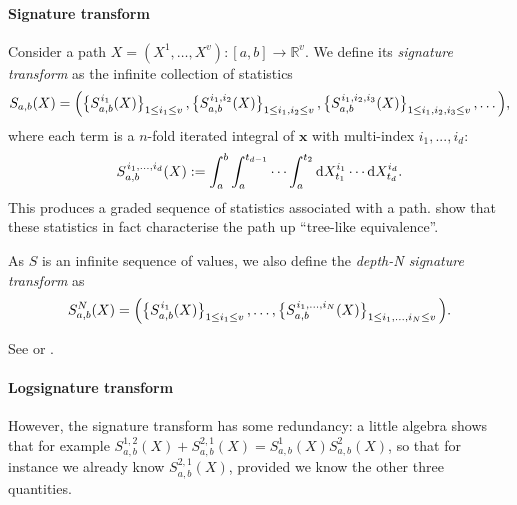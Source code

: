 \paragraph{Signature transform} Consider a path $X = (X^1, \ldots, X^v) \colon [a, b] \rightarrow \mathbb{R}^v$. We define its \emph{signature transform} as the infinite collection of statistics
\begin{equation} 
    S_{a, b}(X) = \Big(\big\{S_{a, b}^{\hspace{0.25mm} i_1}(X)\big\}_{1\leq i_1\leq v}\, , \big\{S_{a, b}^{\hspace{0.25mm} i_1, i_2}(X)\big\}_{1\leq i_1,i_2\leq v}\, , \big\{S_{a, b}^{\hspace{0.25mm} i_1, i_2, i_3}(X)\big\}_{1\leq i_1,i_2,i_3\leq v}\, , \ldots\Big),
    \label{eq:path_signature}
\end{equation}
where each term is a $n$-fold iterated integral of $\mathbf{x}$ with multi-index $i_1,...,i_d$:
\begin{equation}
    S_{a, b}^{\hspace{0.25mm} i_1,...,i_d}(X) := \int_a^b\int_a^{t_{d-1}}\cdots\int_a^{t_2} \mathrm{d} X_{t_1}^{i_1}\cdots \mathrm{d} X_{t_d}^{i_d}.
    \label{eq:sig_moments}
\end{equation}
This produces a graded sequence of statistics associated with a path. \citet{hambly2010sigunique} show that these statistics in fact characterise the path up ``tree-like equivalence''.


As $S$ is an infinite sequence of values, we also define the \emph{depth-N signature transform} as
\begin{equation} 
    S^N_{a, b}(X) = \Big(\big\{S_{a,b}^{\hspace{0.25mm} i_1}(X)\big\}_{1\leq i_1\leq v}\,,\ldots, \big\{S_{a,b}^{\hspace{0.25mm} i_1, \ldots,i_N}(X)\big\}_{1\leq i_1,\ldots,i_N\leq v}\,\Big).
    \label{eq:truncated_path_signature}
\end{equation}

See \citet{roughpath2007notes} or \citet[Appendix A]{bonnier2019sig}.

\paragraph{Logsignature transform} However, the signature transform has some redundancy: a little algebra shows that for example $S^{1, 2}_{a, b}(X) + S^{2, 1}_{a, b}(X) = S^1_{a, b}(X) S^2_{a, b}(X)$, so that for instance we already know $S^{2, 1}_{a, b}(X)$, provided we know the other three quantities.

